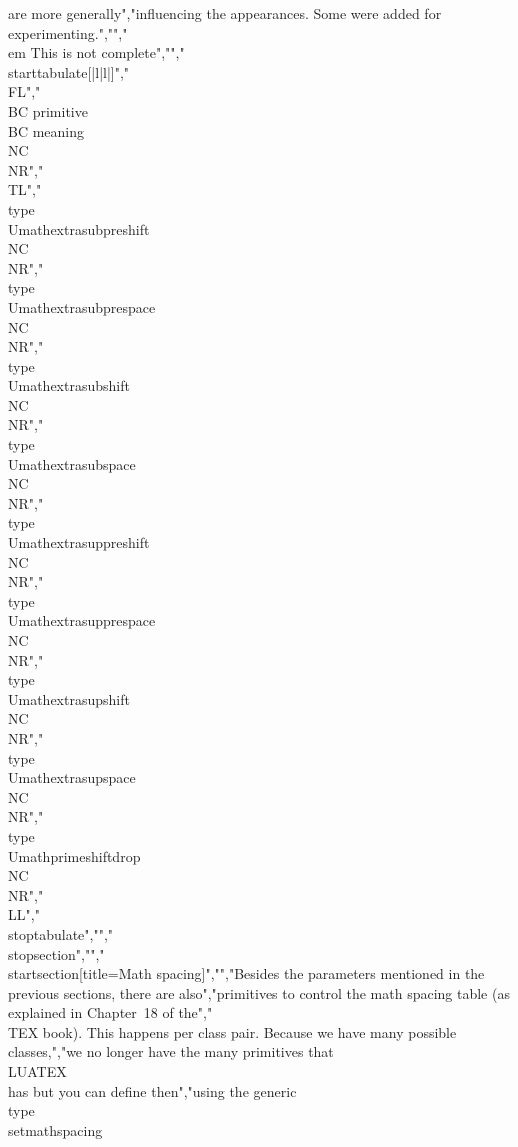 are more generally","influencing the appearances. Some were added for experimenting.","","{\\em This is not complete}","","\\starttabulate[|l|l|]","\\FL","\\BC primitive \\BC meaning \\NC \\NR","\\TL","\\type {\\Umathextrasubpreshift} \\NC \\NR","\\type {\\Umathextrasubprespace} \\NC \\NR","\\type {\\Umathextrasubshift}    \\NC \\NR","\\type {\\Umathextrasubspace}    \\NC \\NR","\\type {\\Umathextrasuppreshift} \\NC \\NR","\\type {\\Umathextrasupprespace} \\NC \\NR","\\type {\\Umathextrasupshift}    \\NC \\NR","\\type {\\Umathextrasupspace}    \\NC \\NR","\\type {\\Umathprimeshiftdrop}   \\NC \\NR","\\LL","\\stoptabulate","","\\stopsection","","\\startsection[title={Math spacing}]","","Besides the parameters mentioned in the previous sections, there are also","primitives to control the math spacing table (as explained in Chapter~18 of the","\\TEX book). This happens per class pair. Because we have many possible classes,","we no longer have the many primitives that \\LUATEX\\ has but you can define then","using the generic \\type {\\setmathspacing} 